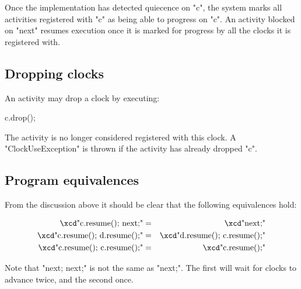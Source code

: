 Once the implementation has detected quiecence on \xcd"c", the system
marks all activities registered with \xcd"c" as being able to progress
on \xcd"c". An activity blocked on \xcd"next" resumes execution once
it is marked for progress by all the clocks it is registered with.

\subsection{Dropping clocks}\label{sec:clock:drop}
An activity may drop a clock by executing:
\begin{xten}
c.drop();
\end{xten}

\noindent{} The activity is no longer considered registered with this
clock.  A \xcd"ClockUseException" is thrown if the activity has
already dropped \xcd"c".


%

\subsection{Program equivalences}
From the discussion above it should be clear that the following
equivalences hold:

\begin{eqnarray}
 \mbox{\xcd"c.resume(); next;"}       &=& \mbox{\xcd"next;"}\\
 \mbox{\xcd"c.resume(); d.resume();"} &=& \mbox{\xcd"d.resume(); c.resume();"}\\
 \mbox{\xcd"c.resume(); c.resume();"} &=& \mbox{\xcd"c.resume();"}
\end{eqnarray}

Note that \xcd"next; next;" is not the same as \xcd"next;". The
first will wait for clocks to advance twice, and the second
once.  


